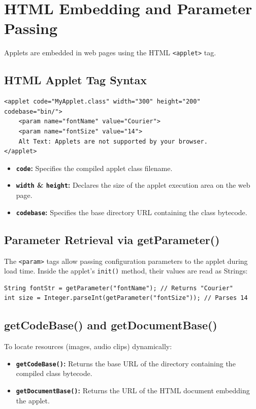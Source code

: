 \documentclass[12pt,a4paper]{article}
\begin{document}
\section{HTML Embedding and Parameter Passing}

Applets are embedded in web pages using the HTML \texttt{<applet>} tag. 

\subsection{HTML Applet Tag Syntax}
\begin{verbatim}
<applet code="MyApplet.class" width="300" height="200" codebase="bin/">
    <param name="fontName" value="Courier">
    <param name="fontSize" value="14">
    Alt Text: Applets are not supported by your browser.
</applet>
\end{verbatim}
\begin{itemize}[leftmargin=*, itemsep=3pt]
  \item \textbf{\texttt{code}:} Specifies the compiled applet class filename.
  \item \textbf{\texttt{width} \& \texttt{height}:} Declares the size of the applet execution area on the web page.
  \item \textbf{\texttt{codebase}:} Specifies the base directory URL containing the class bytecode.
\end{itemize}

\subsection{Parameter Retrieval via getParameter()}
The \texttt{<param>} tags allow passing configuration parameters to the applet during load time. Inside the applet's \texttt{init()} method, their values are read as Strings:
\begin{verbatim}
String fontStr = getParameter("fontName"); // Returns "Courier"
int size = Integer.parseInt(getParameter("fontSize")); // Parses 14
\end{verbatim}

\subsection{getCodeBase() and getDocumentBase()}
To locate resources (images, audio clips) dynamically:
\begin{itemize}[leftmargin=*, itemsep=3.5pt]
  \item \textbf{\texttt{getCodeBase()}:} Returns the base URL of the directory containing the compiled class bytecode.
  \item \textbf{\texttt{getDocumentBase()}:} Returns the URL of the HTML document embedding the applet.
\end{itemize}
\end{document}
